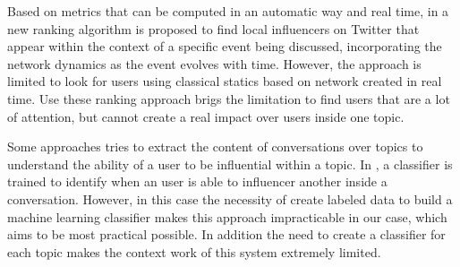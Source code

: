 Based on metrics that can be computed in an automatic way and real time, in \cite{Kardara2015} a new ranking algorithm is proposed to find local influencers on Twitter that appear within the context of a specific event being discussed, incorporating the network dynamics as the event evolves with time. However, the approach is limited to look for users using classical statics based on network created in real time. Use these ranking approach brigs the limitation to find users that are a lot of attention, but cannot create a real impact over users inside one topic.

Some approaches tries to extract the content of conversations over topics to understand the ability of a user to be influential within a topic. In \cite{Biran2012}, a classifier is trained to identify when an user is able to influencer another inside a conversation. However, in this case the necessity of create labeled data to build a machine learning classifier makes this approach impracticable in our case, which aims to be most practical possible. In addition the need to create a classifier for each topic makes the context work of this system extremely limited.


\\
	
\\


